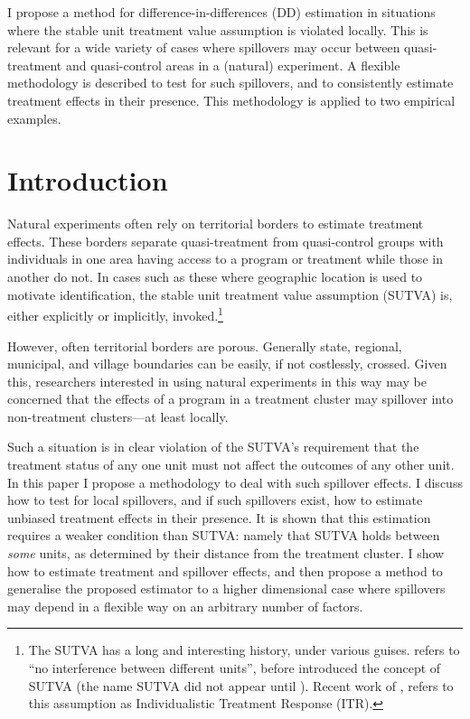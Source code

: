 \begin{chapabstract}
I propose a method for difference-in-differences (DD) estimation in situations 
where the stable unit treatment value assumption is violated locally. This is
relevant for a wide variety of cases where spillovers may occur between quasi-%
treatment and quasi-control areas in a (natural) experiment. A flexible 
methodology is described to test for such spillovers, and to consistently 
estimate treatment effects in their presence. This methodology is applied to two 
empirical examples.
\end{chapabstract}

\newpage
\section{Introduction}
Natural experiments often rely on territorial borders to estimate treatment 
effects.  These borders separate quasi-treatment from quasi-control groups with
individuals in one area having access to a program or treatment while those in 
another do not.  In cases such as these where geographic location is used to 
motivate identification, the stable unit treatment value assumption (SUTVA) is, 
either explicitly or implicitly, invoked.\footnote{The SUTVA has a long and 
interesting history, under various guises. \citet{Cox1958} refers to ``no 
interference between different units'', before \citet{Rubin1978} introduced the 
concept of SUTVA (the name SUTVA did not appear until \citet{Rubin1980}).  
Recent work of \citet{Manski2013}, refers to this assumption as Individualistic 
Treatment Response (ITR).}

However, often territorial borders are porous.  Generally state, regional,
municipal, and village boundaries can be easily, if not costlessly, crossed.
Given this, researchers interested in using natural experiments in this way may
be concerned that the effects of a program in a treatment cluster may spillover 
into non-treatment clusters---at least locally.

Such a situation is in clear violation of the SUTVA's requirement that the 
treatment status of any one unit must not affect the outcomes of any other unit.  
In this paper I propose a methodology to deal with such spillover effects.  I
discuss how to test for local spillovers, and if such spillovers exist, how to 
estimate unbiased treatment effects in their presence.  It is shown that this 
estimation requires a weaker condition than SUTVA: namely that SUTVA holds 
between \emph{some} units, as determined by their distance from the treatment 
cluster.  I show how to estimate treatment and spillover effects, and then
propose a method to generalise the proposed estimator to a higher dimensional 
case where spillovers may depend in a flexible way on an arbitrary number of 
factors.

